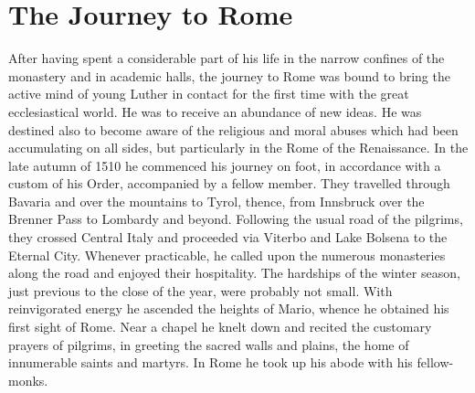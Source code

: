 \section{The Journey to Rome}

After having spent a considerable part of his life in the narrow
confines of the monastery and in academic halls, the journey to Rome
was bound to bring the active mind of young Luther in contact
for the first time with the great ecclesiastical world. He was to receive
an abundance of new ideas. He was destined also to become
aware of the religious and moral abuses which had been accumulating
on all sides, but particularly in the Rome of the Renaissance. In the
late autumn of 1510 he commenced his journey on foot, in accordance
with a custom of his Order, accompanied by a fellow member.
They travelled through Bavaria and over the mountains to Tyrol,
thence, from Innsbruck over the Brenner Pass to Lombardy and
beyond. Following the usual road of the pilgrims, they crossed Central
Italy and proceeded via Viterbo and Lake Bolsena to the Eternal
City. Whenever practicable, he called upon the numerous monasteries
along the road and enjoyed their hospitality. The hardships of the
winter season, just previous to the close of the year, were probably
not small. With reinvigorated energy he ascended the heights of
Mario, whence he obtained his first sight of Rome. Near a chapel
he knelt down and recited the customary prayers of pilgrims, in
greeting the sacred walls and plains, the home of innumerable saints
and martyrs. In Rome he took up his abode with his fellow-monks.

